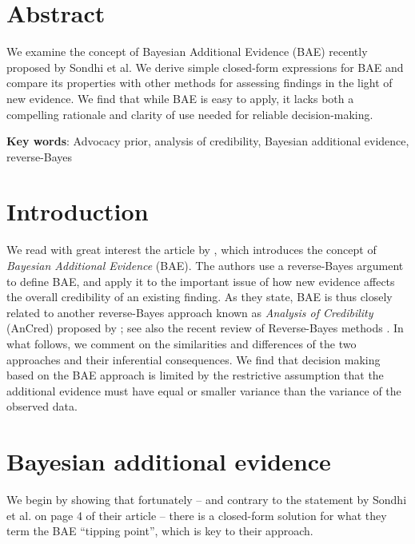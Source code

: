 \section*{Abstract}
We examine the concept of Bayesian Additional Evidence (BAE) recently proposed
by Sondhi et al. We derive simple closed-form expressions for BAE and compare
its properties with other methods for assessing findings in the light of new
evidence. We find that while BAE is easy to apply, it lacks both a compelling
rationale and clarity of use needed for reliable decision-making.

\textbf{Key words}: Advocacy prior, analysis of credibility, Bayesian additional
evidence, reverse-Bayes


\section{Introduction}

We read with great interest the article by \citet{Sondhi2021}, which introduces
the concept of \emph{Bayesian Additional Evidence} (BAE). The authors use a
reverse-Bayes argument to define BAE, and apply it to the important issue of how
new evidence affects the overall credibility of an existing finding. As they
state, BAE is thus closely related to another reverse-Bayes approach known as
\emph{Analysis of Credibility} (AnCred) proposed by \citet{Matthews2018}; see
also the recent review of Reverse-Bayes methods \citep{Held2021b}. In what
follows, we comment on the similarities and differences of the two approaches
and their inferential consequences. We find that decision making based on the
BAE approach is limited by the restrictive assumption that the additional
evidence must have equal or smaller variance than the variance of the observed
data.


\section{Bayesian additional evidence}
We begin by showing that fortunately -- and contrary to the statement by Sondhi
et al. on page 4 of their article -- there is a closed-form solution for what
they term the BAE ``tipping point'', which is key to their approach.

